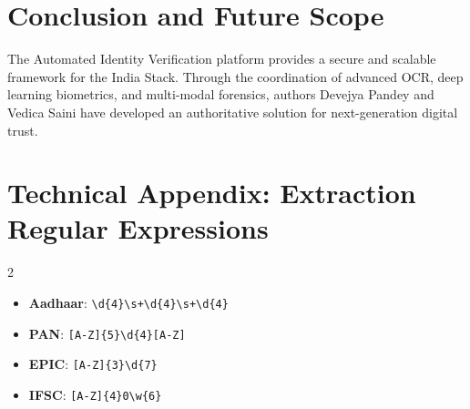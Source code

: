 \documentclass[11pt,a4paper]{article}
\begin{document}
\section{Conclusion and Future Scope}
The Automated Identity Verification platform provides a secure and scalable framework for the India Stack. Through the coordination of advanced OCR, deep learning biometrics, and multi-modal forensics, authors Devejya Pandey and Vedica Saini have developed an authoritative solution for next-generation digital trust.

\newpage
\appendix
\section{Technical Appendix: Extraction Regular Expressions}
\begin{multicols}{2}
\begin{itemize}
    \item \textbf{Aadhaar}: \texttt{\textbackslash d\{4\}\textbackslash s+\textbackslash d\{4\}\textbackslash s+\textbackslash d\{4\}}
    \item \textbf{PAN}: \texttt{[A-Z]\{5\}\textbackslash d\{4\}[A-Z]}
    \item \textbf{EPIC}: \texttt{[A-Z]\{3\}\textbackslash d\{7\}}
    \item \textbf{IFSC}: \texttt{[A-Z]\{4\}0\textbackslash w\{6\}}
\end{itemize}
\end{multicols}
\end{document}
